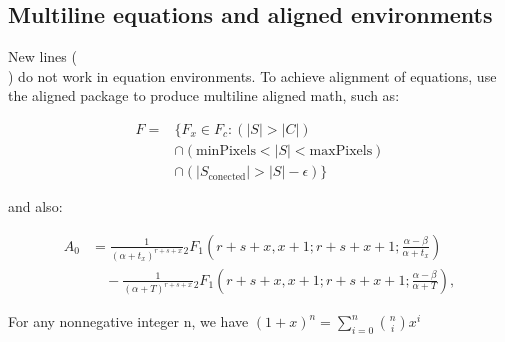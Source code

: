 \subsection{Multiline equations and aligned environments}
New lines (\\ ) do not work in equation environments. To achieve alignment of equations, use the aligned  package to produce multiline aligned math, such as:
\newline
\begin{center}
\begin{align}
F ={} & \{F_{x} \in  F_{c} : (|S| > |C|) \\
      & \cap (\mathrm{minPixels}  < |S| < \mathrm{maxPixels}) \\
      & \cap (|S_{\mathrm{conected}}| > |S| - \epsilon) \}
\end{align}
\end{center}
and also:
\begin{center}
\begin{align}
A_0 & =   \frac{1}{(\alpha+t_x)^{r+s+x}}{}_2 F_1\left( r+s+x,x+1;r+s+x+1;\frac{\alpha-\beta}{\alpha + t_x} \right) \\
& \quad - \frac{1}{(\alpha+T)^{r+s+x}}{}_2 F_1\left( r+s+x,x+1;r+s+x+1;\frac{\alpha-\beta}{\alpha + T} \right),
\end{align}
\end{center}

\begin{theorem}
For any nonnegative integer n, we have
$(1+x)^n = \sum_{i=0}^n {n \choose i} x^i$
\end{theorem}

